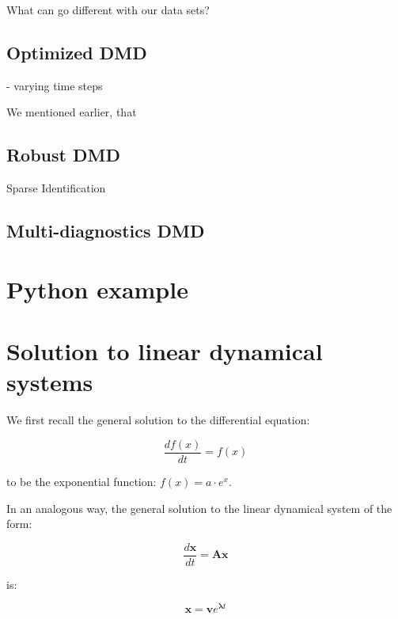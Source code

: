 \documentclass[10pt,twocolumn]{article}
\begin{document}
What can go different with our data sets?

\subsection{Optimized DMD}

- varying time steps

We mentioned earlier, that 

\subsection{Robust DMD}



Sparse Identification




\subsection{Multi-diagnostics DMD}

\section{Python example}



\appendix

\section{Solution to linear dynamical systems} \label{app:A}

We first recall the general solution to the differential equation:

\begin{equation} \label{eq:DE_exp}
\frac{d f(x)}{dt} = f(x)
\end{equation}

to be the exponential function: $f(x) = a \cdot e^{x}$.


In an analogous way, the general solution to the linear dynamical system of the form:

\begin{equation} \label{eq:system_linear_A}
\frac{d \mathbf{x}}{dt} = \mathbf{A} \mathbf{x}
\end{equation}

is:

\begin{equation} \label{eq:general_solution_A}
\mathbf{x} = \mathbf{v} e^{\mathbf{\lambda} t}
\end{equation}
\end{document}
